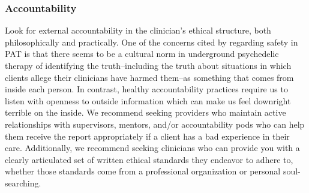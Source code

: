 \documentclass[12pt,letterpaper]{book}
\begin{document}
\subsubsection*{Accountability}
Look for external accountability in the clinician's ethical structure, both philosophically and practically. One of the concerns cited by \textcite{powerTrip} regarding safety in PAT is that there seems to be a cultural norm in underground psychedelic therapy of identifying the truth–including the truth about situations in which clients allege their clinicians have harmed them–as something that comes from inside each person. In contrast, healthy accountability practices require us to listen with openness to outside information which can make us feel downright terrible on the inside. We recommend seeking providers who maintain active relationships with supervisors, mentors, and/or accountability pods \cite{podmapping} who can help them receive the report appropriately if a client has a bad experience in their care. Additionally, we recommend seeking clinicians who can provide you with a clearly articulated set of written ethical standards they endeavor to adhere to, whether those standards come from a professional organization or personal soul-searching. 
\end{document}
